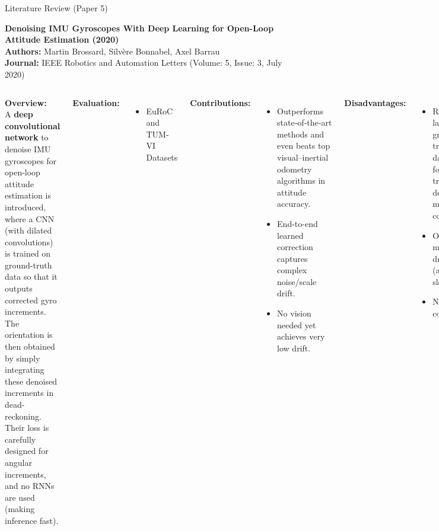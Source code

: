 \documentclass[aspectratio=169,xcolor=dvipsnames]{beamer}
\begin{document}
\begin{frame}{Literature Review (Paper 5)}

\textbf{Denoising IMU Gyroscopes With Deep Learning for Open-Loop Attitude Estimation (2020)} \hfill \textcolor{blue}{\cite{brossard2020openloopCNN}}\\
\textbf{Authors:} Martin Brossard, Silvère Bonnabel, Axel Barrau \\
\textbf{Journal:} IEEE Robotics and Automation Letters (Volume: 5, Issue: 3, July 2020)

\vspace{1em}
\scriptsize
\begin{columns}
    \textbf{Overview:}\\
    A \textbf{deep convolutional network} to denoise IMU gyroscopes for open-loop attitude estimation is introduced, where a CNN (with dilated convolutions) is trained on ground-truth data so that it outputs corrected gyro increments. The orientation is then obtained by simply integrating these denoised increments in dead-reckoning. Their loss is carefully designed for angular increments, and no RNNs are used (making inference fast). 

    \vspace{0.5em}
    \textbf{Evaluation:}
    \begin{itemize}
        \item EuRoC and TUM-VI Datasets
    \end{itemize}

    \textbf{Contributions:}
    \begin{itemize}
        \item  Outperforms state‑of‑the‑art methods and even beats top visual–inertial odometry algorithms in attitude accuracy. 
        \item End-to-end learned correction captures complex noise/scale drift. 
        \item No vision needed yet achieves very low drift.
    \end{itemize}

    \vspace{0.5em}
    \textbf{Disadvantages:}
    \begin{itemize}
        \item Requires large ground-truth datasets for training design is more complex.
        \item Open-loop mode still drifts (albeit slower).
        \item Network complexity. 
    \end{itemize}
\end{columns}

\end{frame}
\end{document}
